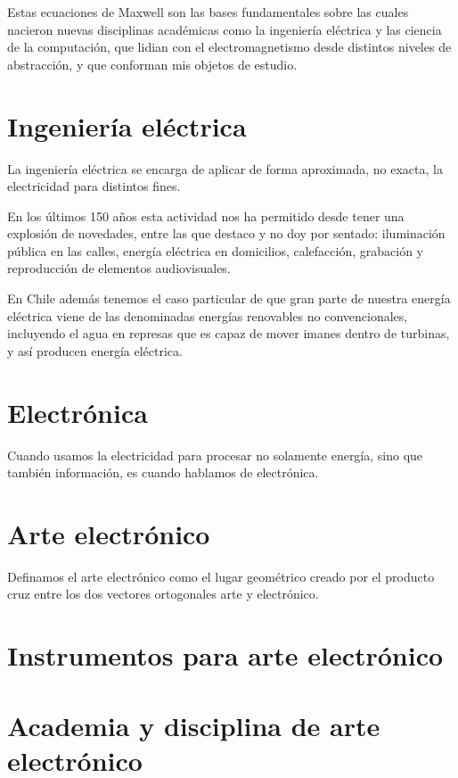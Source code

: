 \documentclass{article}
\begin{document}
Estas ecuaciones de Maxwell son las bases fundamentales sobre las cuales nacieron nuevas disciplinas académicas como la ingeniería eléctrica y las ciencia de la computación, que lidian con el electromagnetismo desde distintos niveles de abstracción, y que conforman mis objetos de estudio.

\section{Ingeniería eléctrica}

La ingeniería eléctrica se encarga de aplicar de forma aproximada, no exacta, la electricidad para distintos fines.

En los últimos 150 años esta actividad nos ha permitido desde tener una explosión de novedades, entre las que destaco y no doy por sentado: iluminación pública en las calles, energía eléctrica en domicilios, calefacción, grabación y reproducción de elementos audiovisuales.

En Chile además tenemos el caso particular de que gran parte de nuestra energía eléctrica viene de las denominadas energías renovables no convencionales, incluyendo el agua en represas que es capaz de mover imanes dentro de turbinas, y así producen energía eléctrica.

\section{Electrónica}

Cuando usamos la electricidad para procesar no solamente energía, sino que también información, es cuando hablamos de electrónica.



\section{Arte electrónico}

Definamos el arte electrónico como el lugar geométrico creado por el producto cruz entre los dos vectores ortogonales arte y electrónico.

\section{Instrumentos para arte electrónico}

\section{Academia y disciplina de arte electrónico}
\end{document}

